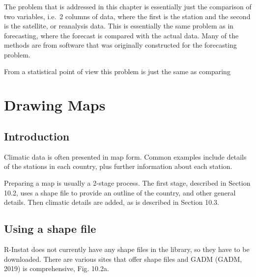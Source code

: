 \documentclass[
  letterpaper,
  DIV=11,
  numbers=noendperiod]{scrreprt}
\begin{document}
The problem that is addressed in this chapter is essentially just the
comparison of two variables, i.e.~2 columns of data, where the first is
the station and the second is the satellite, or reanalysis data. This is
essentially the same problem as in forecasting, where the forecast is
compared with the actual data. Many of the methods are from software
that was originally constructed for the forecasting problem.

From a statistical point of view this problem is just the same as
comparing


\chapter{Drawing Maps}\label{drawing-maps}

\section{Introduction}\label{introduction-9}

Climatic data is often presented in map form. Common examples include
details of the stations in each country, plus further information about
each station.

Preparing a map is usually a 2-stage process. The first stage, described
in Section 10.2, uses a shape file to provide an outline of the country,
and other general details. Then climatic details are added, as is
described in Section 10.3.

\section{Using a shape file}\label{using-a-shape-file}

R-Instat does not currently have any shape files in the library, so they
have to be downloaded. There are various sites that offer shape files
and GADM (GADM, 2019) is comprehensive, Fig. 10.2a.
\end{document}
